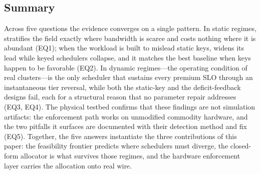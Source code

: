 \subsection{Summary}
\label{sec:eval-summary}

Across five questions the evidence converges on a single pattern. In static regimes, \Name stratifies the field exactly where bandwidth is scarce and costs nothing where it is abundant (EQ1); when the workload is built to mislead static keys, \Name widens its lead while keyed schedulers collapse, and it matches the best baseline when keys happen to be favorable (EQ2). In dynamic regimes---the operating condition of real clusters---\Name is the only scheduler that sustains every premium SLO through an instantaneous tier reversal, while both the static-key and the deficit-feedback designs fail, each for a structural reason that no parameter repair addresses (EQ3, EQ4). The physical testbed confirms that these findings are not simulation artifacts: the enforcement path works on unmodified commodity hardware, and the two pitfalls it surfaces are documented with their detection method and fix (EQ5). Together, the five answers instantiate the three contributions of this paper: the feasibility frontier predicts where schedulers must diverge, the closed-form allocator is what survives those regimes, and the hardware enforcement layer carries the allocation onto real wire.